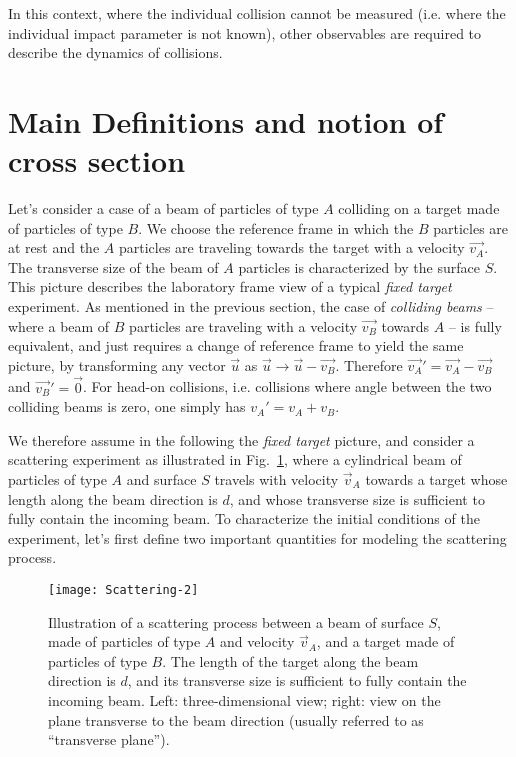In this context, where the individual collision cannot be measured (i.e. where the individual impact parameter is not known), other observables are required to describe the dynamics of collisions.


\section{Main Definitions and notion of cross section}

Let's consider a case of a beam of particles of type $A$ colliding on a target made of particles of type $B$. We choose the reference frame in which the $B$ particles  are at rest and the $A$ particles  are traveling towards the target with a velocity $\vec{v_A}$. The transverse size of the beam of  $A$ particles is characterized by the surface ${S}$. This picture describes the laboratory frame view of a typical {\it fixed target} experiment. As mentioned in the previous section, the case of {\it colliding beams} -- where a beam of $B$ particles are traveling with a velocity $\vec{v_B}$ towards $A$ -- is fully equivalent, and just requires a change of reference frame to yield the same picture, by transforming any vector $\vec{u}$ as 
\(\vec{u} \rightarrow \vec{u} -\vec{v_B}.\)
Therefore $\vec{v_A}' = \vec{v_A}-\vec{v_B}$ and  $\vec{v_B}' = \vec{0}$. For head-on collisions, i.e. collisions where angle between the two colliding beams is zero, one simply has $v_A' = v_A+v_B$. 

We therefore assume in the following the {\it fixed target} picture, and consider a scattering experiment as illustrated in Fig.~\ref{fig:Scattering-2}, where a cylindrical beam of particles of type $A$ and surface $S$ travels with velocity $\vec{v}_A$ towards a target whose length along the beam direction is $d$, and whose transverse size is sufficient to fully contain the incoming beam.
To characterize the initial conditions of the experiment, let's first define two important quantities for modeling the scattering process.

\begin{figure}
    \texttt{[image: Scattering-2]}
    \caption{Illustration of a scattering process between a beam of surface $S$, made of particles of type $A$ and velocity $\vec{v}_A$, and a target made of particles of type $B$. The length of the target along the beam direction is $d$, and its transverse size is sufficient to fully contain the incoming beam. Left: three-dimensional view; right: view on the plane transverse to the beam direction (usually referred to as ``transverse plane'').}
    \label{fig:Scattering-2}
\end{figure}{}

